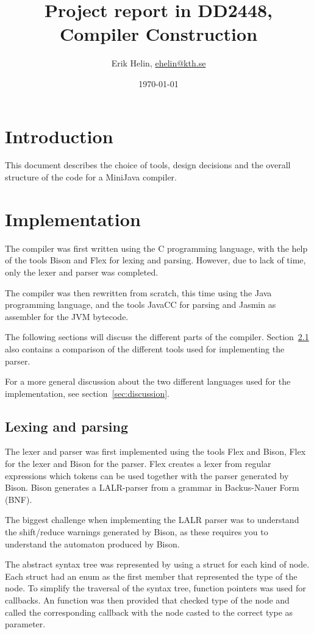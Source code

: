 \documentclass[11pt,oneside,a4paper]{article}
\begin{document}
\title{Project report in DD2448, Compiler Construction}
\author{Erik Helin, \href{mailto:ehelin@kth.se}{ehelin@kth.se}}
\date{\today}
\maketitle

\tableofcontents

\section{Introduction}
This document describes the choice of tools, design decisions and the overall 
structure of the code for a MiniJava compiler.
\section{Implementation}
The compiler was first written using the C programming language, with the help
of the tools Bison and Flex for lexing and parsing. However, due to lack of
time, only the lexer and parser was completed. 

The compiler was then rewritten from scratch, this time using the Java
programming language, and the tools JavaCC for parsing and Jasmin as assembler
for the JVM bytecode.

The following sections will discuss the different parts of the compiler.
Section~\ref{sec:lexing_and_parsing} also contains a comparison of the
different tools used for implementing the parser.

For a more general discussion about the two different languages used for the
implementation, see section~\ref{sec:discussion}.
\subsection{Lexing and parsing}
\label{sec:lexing_and_parsing}
The lexer and parser was first implemented using the tools Flex and Bison, Flex
for the lexer and Bison for the parser. Flex creates a lexer from regular
expressions which tokens can be used together with the parser generated by
Bison. Bison generates a LALR-parser from a grammar in Backus-Nauer Form (BNF). 

The biggest challenge when implementing the LALR parser was to understand
the shift/reduce warnings generated by Bison, as these requires you to
understand the automaton produced by Bison.

The abstract syntax tree was represented by using a struct for each kind of
node. Each struct had an enum as the first member that represented 
the type of the node. To simplify the traversal of the syntax tree, 
function pointers was used for callbacks. An function was then provided that 
checked type of the node and called the corresponding callback with the node
casted to the correct type as parameter.
\end{document}

